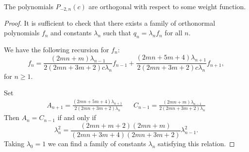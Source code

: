 \documentclass[10pt,a4paper]{amsart}
\begin{document}
	    \begin{theorem}
	         The polynomials $P_{-2,n}(c)$ are orthogonal with respect to some weight function.
	    \end{theorem}

	    \begin{proof}
	        It is sufficient to check that there exists a family of orthonormal polynomials $f_n$ and constants $\lambda_n$ such that $q_n=\lambda_n f_n$ for all $n$.
	        
	        We have the following recursion for $f_n$:
	    \begin{equation*}
	        f_n=\frac{(2 m n+m)\lambda_{n-1}}{2  (2m  n+3m+2)c \lambda_{n} } f_{n-1}+\frac{(2m  n+5m+4) \lambda_{n+1}}{2  (2m n+3m+2)c \lambda_{n} }f_{n+1},
	    \end{equation*}
	    for $n\geq 1$.
	    
	    Set
	    \begin{align*}
	        A_{n+1} = \frac{(2m  n+5m+4) \lambda_{n+1}}{2  (2m n+3m+2) \lambda_{n} }& & C_{n-1}=\frac{(2 m n+m)\lambda_{n-1}}{2  (2m  n+3m+2) \lambda_{n} }
	    \end{align*}
	    Then $A_{n}=C_{n-1}$ if and only if 
	    \begin{equation*}
	        \lambda_n^2=\frac{(2m  n+m+2) (2 m n+m)}{(2m  n+3m+4)(2m  n+3m+2)  }\lambda_{n-1}^2.
	    \end{equation*}
	    Taking $\lambda_0 = 1$ we can find a family of constants $\lambda_n$ satisfying this relation. 
	    \end{proof}
\end{document}

